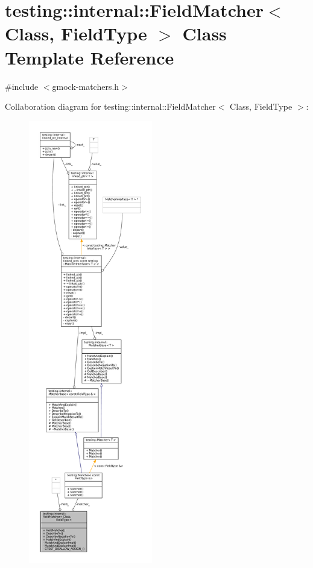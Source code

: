 \hypertarget{classtesting_1_1internal_1_1FieldMatcher}{}\section{testing\+:\+:internal\+:\+:Field\+Matcher$<$ Class, Field\+Type $>$ Class Template Reference}
\label{classtesting_1_1internal_1_1FieldMatcher}


{\ttfamily \#include $<$gmock-\/matchers.\+h$>$}



Collaboration diagram for testing\+:\+:internal\+:\+:Field\+Matcher$<$ Class, Field\+Type $>$\+:
\nopagebreak
\begin{figure}[H]
\begin{center}
\leavevmode
\includegraphics[height=550pt]{classtesting_1_1internal_1_1FieldMatcher__coll__graph}
\end{center}
\end{figure}
